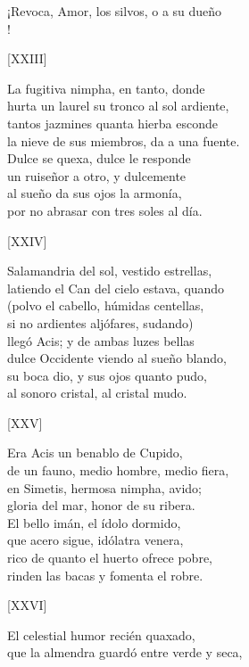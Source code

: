 \documentclass[11pt,a4paper,twoside]{article}
\begin{document}
¡Revoca, Amor, los silvos, o a su dueño\\
!\pend
\begin{center}
	[XXIII]
\end{center}\pstart
La fugitiva nimpha, en tanto, donde\\
hurta un laurel su tronco al sol ardiente,\\
tantos jazmines quanta hierba esconde\\
la nieve de sus miembros, da a una fuente.\\
Dulce se quexa, dulce le responde\\
un ruiseñor a otro, y dulcemente\\
al sueño da sus ojos la armonía,\\
por no abrasar con tres soles al día.\pend
\begin{center}
	[XXIV]
\end{center}\pstart
Salamandria del sol, vestido estrellas,\\
latiendo el Can del cielo estava, quando\\
(polvo el cabello, húmidas centellas,\\
si no ardientes aljófares, sudando)\\
llegó Acis; y de ambas luzes bellas\\
dulce Occidente viendo al sueño blando,\\
su boca dio, y sus ojos quanto pudo,\\
al sonoro cristal, al cristal mudo.\pend
\begin{center}
	[XXV]
\end{center}\pstart
Era Acis un benablo de Cupido,\\
de un fauno, medio hombre, medio fiera,\\
en Simetis, hermosa nimpha, avido;\\
gloria del mar, honor de su ribera.\\
El bello imán, el ídolo dormido,\\
que acero sigue, idólatra venera,\\
rico de quanto el huerto ofrece pobre,\\
rinden las bacas y fomenta el robre.\pend
\begin{center}
	[XXVI]
\end{center}\pstart
El celestial humor recién quaxado,\\
que la almendra guardó entre verde y seca,\\
\end{document}
